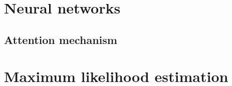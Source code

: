 \label{sec:STAT}
\minitoc
\section{Neural networks}
\subsection{Attention mechanism}
\section{Maximum likelihood estimation}